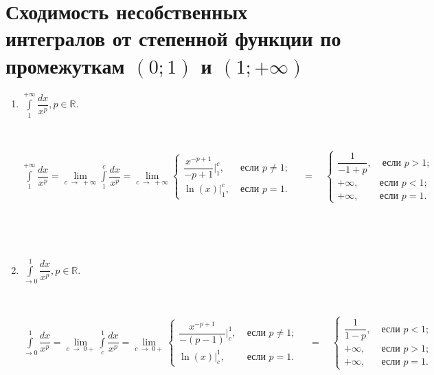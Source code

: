 \documentclass[../main.tex]{subfiles}
\begin{document}
\newpage
\section{Сходимость несобственных интегралов от степенной функции по промежуткам \((0; 1)\) и \( (1; + \infty )\)}
    
\begin{enumerate}
    \item \( \displaystyle\int\limits_{ 1}^{ +\infty} \dfrac{ dx}{ x^p}, p \in \mathbb{R}.\)
    
    ~

    \( \displaystyle\int\limits_{ 1}^{ +\infty} \dfrac{ dx}{ x^p} = \lim\limits_{ c \; \rightarrow \; +\infty} \displaystyle\int\limits_{ 1}^{ c} \dfrac{ dx}{ x^p} = \lim\limits_{ c \; \rightarrow \; +\infty} 
    \displaystyle\begin{cases}
        \dfrac{x^{-p + 1} }{ -p + 1} \bigg|_1^c, & \; \text{если } p \neq 1; \\
        \ln(x) \bigg|_1^c, & \; \text{если } p = 1.
    \end{cases}
    \quad =\quad 
    \begin{cases}
    \dfrac{ 1}{ -1 + p}, & \; \text{если } p > 1; \\
    +\infty, & \text{если } p < 1; \\
    +\infty, & \text{если } p = 1. 
    \end{cases}
    \)

    ~
    
    
    ~

    \item \( \displaystyle\int\limits_{ \rightarrow 0}^{ 1} \dfrac{ dx}{ x^p}, p \in \mathbb{R}. \)
    
    ~

    \( \displaystyle\int\limits_{ \rightarrow 0}^{ 1} \dfrac{ dx}{ x^p} = \lim\limits_{ c \; \rightarrow \; 0+} \displaystyle\int\limits_{ c}^{ 1} \dfrac{ dx}{ x^p} = \lim\limits_{ c \; \rightarrow \; 0+} 
    \begin{cases}
        \dfrac{ x^{-p + 1}}{ -(p - 1)} \bigg|_c^1, & \; \text{если } p \neq 1; \\
        \ln(x) \bigg|_c^1, & \; \text{если } p = 1.
    \end{cases}
    \quad =\quad
    \begin{cases}
        \dfrac{ 1}{ 1 - p}, & \; \text{если } p < 1; \\
        +\infty, & \; \text{если } p > 1; \\
        +\infty, & \; \text{если } p = 1.
    \end{cases}
    \)

    ~

\end{enumerate}
\end{document}
